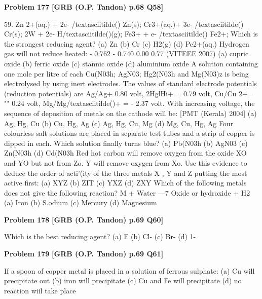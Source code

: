 \begin{problembox}
\textbf{Problem 177} \hfill \textbf{[GRB (O.P. Tandon) p.68 Q58]}
\label{q:ext-grb_all_questions-177}

59. 
Zn 2+(aq.) + 2e- /textasciitilde() 
Zn(s); 
Cr3+(aq.)+ 3e- /textasciitilde() 
Cr(s); 
2W + 2e-
H/textasciitilde()(g); 
Fe3+ + e- /textasciitilde() 
Fe2+; 
Which is the strongest reducing agent? 
(a) Zn 
(b) Cr 
(c) H2(g) 
(d) Pe2+(aq.) 
Hydrogen gas will not reduce heated: 
- 0.762 
- 0.740 
0.00 
0.77 
(VITEEE 2007) 
(a) cupric oxide 
(b) ferric oxide 
(c) stannic oxide 
(d) aluminium oxide 
A solution containing one mole per litre of each Cu(N03h; 
AgN03; Hg2(N03h and Mg(N03)z is being electrolysed by 
using inert electrodes. The values of standard electrode 
potentials (reduction potentials) are Ag/Ag+ 
0.80 volt, 
2HglHi+ = 0.79 volt, Cu/Cu 2+= "" 0.24 volt, Mg/Mg/textasciitilde()+ 
= - 2.37 volt. With increasing voltage, the sequence of 
deposition of metals on the cathode will be: 
[PMT (Kerala) 2004] 
(a) Ag, Hg, Cu 
(b) Cu, Hg, Ag 
(c) Ag, Hg, Cu, Mg 
(d) Mg, Cu, Hg, Ag 
Four colourless salt solutions are placed in separate test tubes 
and a strip of copper is dipped in each. Which solution finally 
turns blue? 
(a) Pb(N03h (b) AgN03 
(c) Zn(N03h (d) Cd(N03h 
Red hot carbon will remove oxygen from the oxide XO and YO 
but not from Zo. Y will remove oxygen from Xo. Use this 
evidence to deduce the order of acti'(ity of the three metals X , 
Y and Z putting the most active first: 
(a) XYZ 
(b) ZIT 
(c) YXZ 
(d) ZXY 
Which of the following metals does not give the following 
reaction? 
M + Water ---7 Oxide or hydroxide + H2 
(a) Iron 
(b) S.odium 
(c) Mercury (d) Magnesium
\end{problembox}

\begin{problembox}
\textbf{Problem 178} \hfill \textbf{[GRB (O.P. Tandon) p.69 Q60]}
\label{q:ext-grb_all_questions-178}

Which is the best reducing agent? 
(a) F 
(b) Cl-
(c) Br-
(d) 1-
\end{problembox}

\begin{problembox}
\textbf{Problem 179} \hfill \textbf{[GRB (O.P. Tandon) p.69 Q61]}
\label{q:ext-grb_all_questions-179}

If a spoon of copper metal is placed in a solution of ferrous 
sulphate: 
(a) Cu will precipitate out 
(b) iron will precipitate 
(c) Cu and Fe will precipitate 
(d) no reaction wiil take place
\end{problembox}

